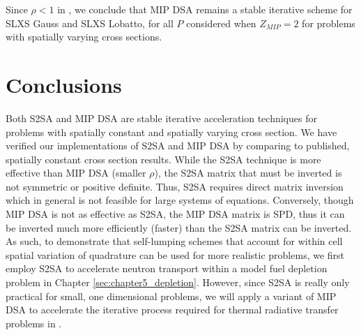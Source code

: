 %
%
%
%
%
Since $\rho<1$ in , we conclude that MIP DSA remains a stable iterative scheme for SLXS Gauss and SLXS Lobatto, for all $P$ considered when $Z_{MIP}=2$ for problems with spatially varying cross sections.

\section{Conclusions}

Both S2SA and MIP DSA are stable iterative acceleration techniques for problems with spatially constant and spatially varying cross section.
We have verified our implementations of S2SA and MIP DSA by comparing to published, spatially constant cross section results.
While the S2SA technique is more effective than MIP DSA (smaller $\rho$), the S2SA matrix that must be inverted is not symmetric or positive definite.
Thus, S2SA requires direct matrix inversion which in general is not feasible for large systems of equations.
Conversely, though MIP DSA is not as effective as S2SA, the MIP DSA matrix is SPD, thus it can be inverted much more efficiently (faster) \cite{mip_mc} than the S2SA matrix can be inverted.
As such, to demonstrate that self-lumping schemes that account for within cell spatial variation of quadrature can be used for more realistic problems, we first employ S2SA to accelerate neutron transport within a model fuel depletion problem in Chapter \ref{sec:chapter5_depletion}.
However, since S2SA is really only practical for small, one dimensional problems, we will apply a variant of MIP DSA to accelerate the iterative process required for thermal radiative transfer problems in .
